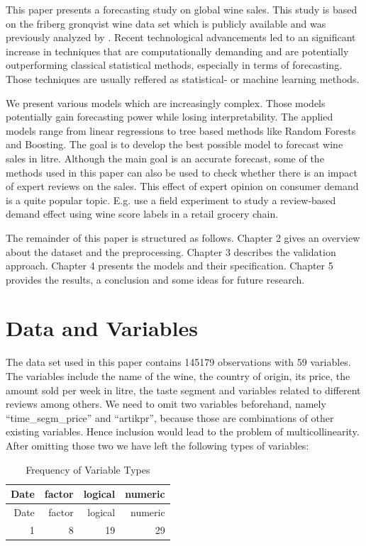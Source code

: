 \documentclass[11pt,]{article}
\begin{document}
This paper presents a forecasting study on global wine sales. This study
is based on the friberg gronqvist wine data set which is publicly
available and was previously analyzed by \textcite[][]{Friberg2012}.
Recent technological advancements led to an significant increase in
techniques that are computationally demanding and are potentially
outperforming classical statistical methods, especially in terms of
forecasting. Those techniques are usually reffered as statistical- or
machine learning methods.

We present various models which are increasingly complex. Those models
potentially gain forecasting power while losing interpretability. The
applied models range from linear regressions to tree based methods like
Random Forests and Boosting. The goal is to develop the best possible
model to forecast wine sales in litre. Although the main goal is an
accurate forecast, some of the methods used in this paper can also be
used to check whether there is an impact of expert reviews on the sales.
This effect of expert opinion on consumer demand is a quite popular
topic. E.g. \textcite[][]{Hilger2011} use a field experiment to study a
review-based demand effect using wine score labels in a retail grocery
chain.

The remainder of this paper is structured as follows. Chapter 2 gives an
overview about the dataset and the preprocessing. Chapter 3 describes
the validation approach. Chapter 4 presents the models and their
specification. Chapter 5 provides the results, a conclusion and some
ideas for future research.

\hypertarget{data-and-variables}{%
\section{Data and Variables}\label{data-and-variables}}

The data set used in this paper contains 145179 observations with 59
variables. The variables include the name of the wine, the country of
origin, its price, the amount sold per week in litre, the taste segment
and variables related to different reviews among others. We need to omit
two variables beforehand, namely \enquote{time\_segm\_price} and
\enquote{artikpr}, because those are combinations of other existing
variables. Hence inclusion would lead to the problem of
multicollinearity. After omitting those two we have left the following
types of variables:

\begin{longtable}[]{@{}rrrr@{}}
\caption{Frequency of Variable Types}\tabularnewline
\toprule
Date & factor & logical & numeric\tabularnewline
\midrule
\endfirsthead
\toprule
Date & factor & logical & numeric\tabularnewline
\midrule
\endhead
1 & 8 & 19 & 29\tabularnewline
\bottomrule
\end{longtable}
\end{document}
